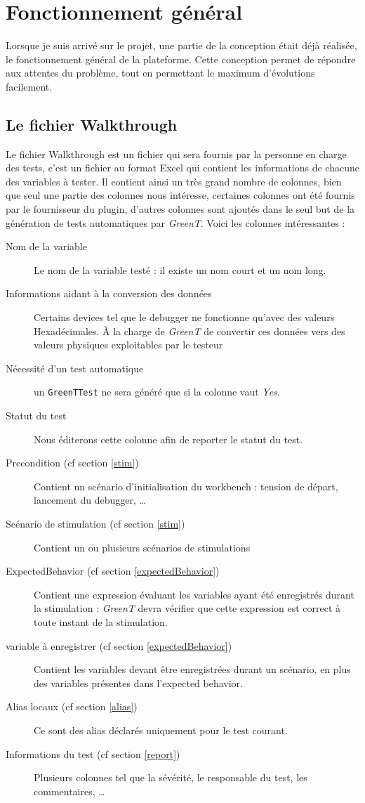 	\section{Fonctionnement général}
	Lorsque je suis arrivé sur le projet, une partie de la conception était déjà réalisée, le fonctionnement général de la plateforme. Cette conception permet de répondre aux attentes du problème, tout en permettant le maximum d'évolutions facilement.
	
	\subsection{Le fichier Walkthrough}\label{wt}
		Le fichier Walkthrough est un fichier qui sera fournis par la personne en charge des tests, c'est un fichier au format Excel qui contient les informations de chacune des variables à tester. Il contient ainsi un très grand nombre de colonnes, bien que seul une partie des colonnes nous intéresse, certaines colonnes ont été fournis par le fournisseur du plugin, d'autres colonnes sont ajoutés dans le seul but de la génération de tests automatiques par \textit{GreenT}. Voici les colonnes intéressantes : 

		\begin{description} 
			\item[Nom de la variable] Le nom de la variable testé : il existe un nom court et un nom long.
			\item[Informations aidant à la conversion des données] Certains devices tel que le debugger ne fonctionne qu'avec des valeurs Hexadécimales. À la charge de \textit{GreenT} de convertir ces données vers des valeurs physiques exploitables par le testeur
			\item[Nécessité d'un test automatique] un \texttt{GreenTTest} ne sera généré que si la colonne vaut \textit{Yes}.
			\item[Statut du test] Nous éditerons cette colonne afin de reporter le statut du test.
			\item[Precondition (cf section \ref{stim})] Contient un scénario d'initialisation du workbench : tension de départ, lancement du debugger, \ldots
			\item[Scénario de stimulation (cf section \ref{stim})] Contient un ou plusieurs scénarios de stimulations
			\item[ExpectedBehavior (cf section \ref{expectedBehavior})] Contient une expression évaluant les variables ayant été enregistrés durant la stimulation : \textit{GreenT} devra vérifier que cette expression est correct à toute instant de la stimulation.
			\item[variable à enregistrer (cf section \ref{expectedBehavior})] Contient les variables devant être enregistrées durant un scénario, en plus des variables présentes dans l'expected behavior.
			\item[Alias locaux (cf section \ref{alias})] Ce sont des alias déclarés uniquement pour le test courant.
			\item[Informations du test (cf section \ref{report})] Plusieurs colonnes tel que la sévérité, le responsable du test, les commentaires, \ldots
		\end{description}

